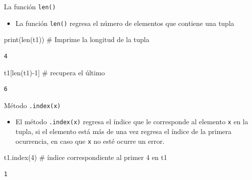 \documentclass[
  ignorenonframetext,
  aspectratio=169,
  spanish,
]{beamer}
\newenvironment{Shaded}{\begin{snugshade}}{\end{snugshade}}
\newcommand{\BuiltInTok}[1]{\textcolor[rgb]{0.00,0.23,0.31}{#1}}
\newcommand{\CommentTok}[1]{\textcolor[rgb]{0.37,0.37,0.37}{#1}}
\newcommand{\DecValTok}[1]{\textcolor[rgb]{0.68,0.00,0.00}{#1}}
\newcommand{\NormalTok}[1]{\textcolor[rgb]{0.00,0.23,0.31}{#1}}
\newcommand{\OperatorTok}[1]{\textcolor[rgb]{0.37,0.37,0.37}{#1}}
\providecommand{\tightlist}{%
  \setlength{\itemsep}{0pt}\setlength{\parskip}{0pt}}
\begin{document}
\begin{frame}[fragile]{La función \texttt{len()}}
\label{la-funciuxf3n-len}
\begin{itemize}
\tightlist
\item
  La función \texttt{len()} regresa el número de elementos que contiene
  una tupla
\end{itemize}

\begin{Shaded}
\begin{Highlighting}[]
\BuiltInTok{print}\NormalTok{(}\BuiltInTok{len}\NormalTok{(t1)) }\CommentTok{\# Imprime  la longitud  de la tupla}
\end{Highlighting}
\end{Shaded}

\begin{verbatim}
4
\end{verbatim}

\begin{Shaded}
\begin{Highlighting}[]
\NormalTok{t1[}\BuiltInTok{len}\NormalTok{(t1)}\OperatorTok{{-}}\DecValTok{1}\NormalTok{]  }\CommentTok{\# recupera el último }
\end{Highlighting}
\end{Shaded}

\begin{verbatim}
6
\end{verbatim}
\end{frame}

\begin{frame}[fragile]{Método \texttt{.index(x)}}
\label{muxe9todo-.indexx}
\begin{itemize}
\tightlist
\item
  El método \texttt{.index(x)} regresa el índice que le corresponde al
  elemento \texttt{x} en la tupla, si el elemento está más de una vez
  regresa el índice de la primera ocurrencia, en caso que \texttt{x} no
  esté ocurre un error.
\end{itemize}

\begin{Shaded}
\begin{Highlighting}[]
\NormalTok{t1.index(}\DecValTok{4}\NormalTok{)    }\CommentTok{\# índice correspondiente al primer 4 en t1}
\end{Highlighting}
\end{Shaded}

\begin{verbatim}
1
\end{verbatim}
\end{frame}
\end{document}
